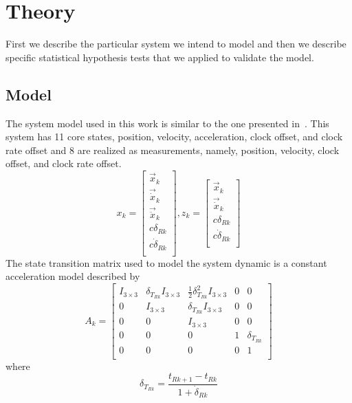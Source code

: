 \section{Theory}\label{sec:theory}
First we describe the particular system we intend to model and then we describe specific statistical hypothesis tests that we applied to validate the model.

\subsection{Model}
The system model used in this work is similar to the one presented in~\cite{course}.  This system has 11 core states, position, velocity, acceleration, clock offset, and clock rate offset and 8 are realized as measurements, namely, position, velocity, clock offset, and clock rate offset.
\begin{equation}
x_k = \left[
\begin{array}{c}
\vec{x}_k\\
\vec{\dot{x}}_k\\
\vec{\ddot{x}}_k\\
c\delta_{Rk}\\
c\dot{\delta}_{Rk}\\
\end{array}
\right],
z_k = \left[
\begin{array}{c}
\vec{x}_k\\
\vec{\dot{x}}_k\\
c\delta_{Rk}\\
c\dot{\delta}_{Rk}\\
\end{array}
\right]
\end{equation}
The state transition matrix used to model the system dynamic is a constant acceleration model described by
\begin{equation}
A_k = \left[
\begin{array}{ccccc}
I_{3\times3} & \delta_{T_{Rk}}I_{3\times3} & \frac{1}{2}\delta_{T_{Rk}}^2I_{3\times3} & 0 & 0\\
0 & I_{3\times3} & \delta_{T_{Rk}}I_{3\times3} & 0 & 0\\
0 & 0 & I_{3\times3} & 0 & 0\\
0 & 0 & 0 & 1 & \delta_{T_{Rk}}\\
0 & 0 & 0 & 0 & 1\\
\end{array}
\right]
\end{equation}
where
\[\delta_{T_{Rk}} = \frac{t_{Rk+1} - t_{Rk}}{1 + \dot{\delta}_{Rk}}\]

